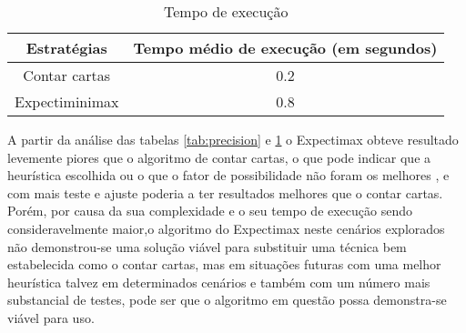 \begin{table}[htbp]
    \centering
    \caption{Tempo de execução}
    \begin{tabular}{|c | c |} 
        \hline
        Estratégias & Tempo médio de execução (em segundos) \\ 
        \hline 
        Contar cartas  & 0.2 \\
        \hline
        Expectiminimax & 0.8 \\
        \hline
    \end{tabular}
    \label{tab:execution_time}
\end{table}

A partir da análise das tabelas \ref{tab:precision} e \ref{tab:execution_time} 
o Expectimax obteve resultado levemente piores que o algoritmo de contar cartas,
o que pode indicar que a heurística escolhida \cite{Introduction-high-low} \cite{odds-house-edge} \cite{win-loss-data} ou o que o fator de possibilidade não 
foram os melhores , e com mais teste e ajuste poderia a ter resultados melhores que o 
contar cartas. Porém, por causa da sua complexidade e o seu tempo de execução 
sendo consideravelmente maior,o algoritmo do Expectimax neste 
cenários explorados não demonstrou-se uma solução viável para substituir uma técnica bem 
estabelecida como o contar cartas, mas em situações futuras com uma melhor heurística 
talvez em determinados cenários e também com um número mais substancial de testes, pode 
ser que o algoritmo em questão possa demonstra-se viável para uso. 

